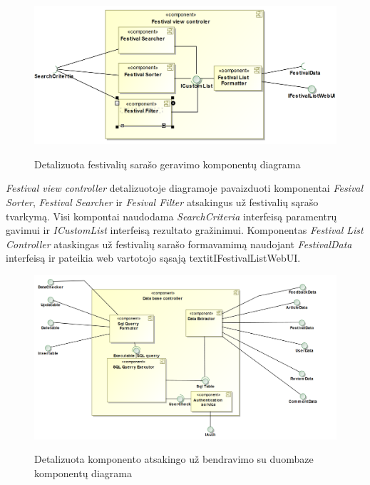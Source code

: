 ﻿\documentclass{VUMIFPSkursinis}
\begin{document}
 \begin{figure}[H]
\centering
    \includegraphics[scale=0.4]{img/PSI3/FestivalisViewController.PNG}
	\label{mantas:2}
	\caption{Detalizuota festivalių sarašo geravimo komponentų diagrama}
\end{figure}

\textit{Festival view controller} detalizuotoje diagramoje pavaizduoti komponentai \textit{Fesival Sorter}, \textit{Festival Searcher} ir \textit{Fesival Filter} atsakingus už festivalių sąrašo tvarkymą. Visi kompontai naudodama \textit{SearchCriteria} interfeisą paramentrų gavimui ir \textit{ICustomList} interfeisą rezultato gražinimui. Komponentas \textit{Festival List Controller} ataskingas už festivalių sarašo formavamimą naudojant \textit{FestivalData} interfeisą ir pateikia web vartotojo sąsają textit{IFestivalListWebUI}. 

\begin{figure}[H]
\centering
    \includegraphics[scale=0.3]{img/PSI3/DataBaseController.PNG}
	\label{mantas:4}
	\caption{Detalizuota komponento atsakingo už bendravimo su duombaze komponentų diagrama}
\end{figure}
\end{document}
